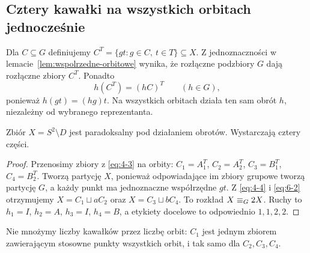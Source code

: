\subsection{Cztery kawałki na wszystkich orbitach jednocześnie}
Dla $C\subseteq G$ definiujemy $C^T=\{gt:g\in C,\ t\in T\}\subseteq X$. Z jednoznaczności w lemacie~\ref{lem:wspolrzedne-orbitowe} wynika, że rozłączne podzbiory $G$ dają rozłączne zbiory $C^T$. Ponadto
\begin{equation}\label{eq:6-2}
 h(C^T)=(hC)^T\qquad(h\in G),
\end{equation}
ponieważ $h(gt)=(hg)t$. Na wszystkich orbitach działa ten sam obrót $h$, niezależny od wybranego reprezentanta.
\begin{twierdzenie}[Paradoksalność $X$]\label{tw:paradoksalnosc-x}
Zbiór $X=S^2\setminus D$ jest paradoksalny pod działaniem obrotów. Wystarczają cztery części.
\end{twierdzenie}
\begin{proof}
Przenosimy zbiory z \eqref{eq:4-3} na orbity: $C_1=A_1^T$, $C_2=A_2^T$, $C_3=B_1^T$, $C_4=B_2^T$. Tworzą partycję $X$, ponieważ odpowiadające im zbiory grupowe tworzą partycję $G$, a każdy punkt ma jednoznaczne współrzędne $gt$. Z \eqref{eq:4-4} i \eqref{eq:6-2} otrzymujemy $X=C_1\sqcup aC_2$ oraz $X=C_3\sqcup bC_4$. To rozkład $X\mathrel{\equiv_G}2X$. Ruchy to $h_1=I$, $h_2=A$, $h_3=I$, $h_4=B$, a etykiety docelowe to odpowiednio $1,1,2,2$.
\end{proof}
Nie mnożymy liczby kawałków przez liczbę orbit: $C_1$ jest jednym zbiorem zawierającym stosowne punkty wszystkich orbit, i tak samo dla $C_2,C_3,C_4$.

